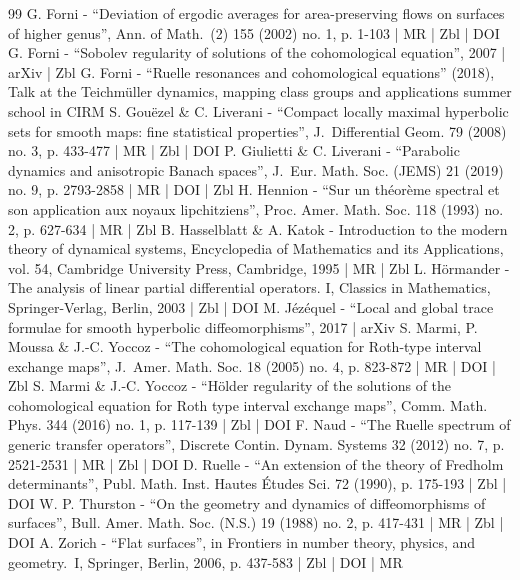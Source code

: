 \documentclass[10pt]{amsart}
\theoremstyle{definition}
\numberwithin{equation}{section}
\begin{document}
\begin{thebibliography}{99}
G. Forni - “Deviation of ergodic averages for area-preserving flows on surfaces of higher genus”, Ann. of Math. (2) 155 (2002) no. 1, p. 1-103 | MR | Zbl | DOI
G. Forni - “Sobolev regularity of solutions of the cohomological equation”, 2007 | arXiv | Zbl
G. Forni - “Ruelle resonances and cohomological equations” (2018), Talk at the Teichmüller dynamics, mapping class groups and applications summer school in CIRM
S. Gouëzel \& C. Liverani - “Compact locally maximal hyperbolic sets for smooth maps: fine statistical properties”, J. Differential Geom. 79 (2008) no. 3, p. 433-477 | MR | Zbl | DOI
P. Giulietti \& C. Liverani - “Parabolic dynamics and anisotropic Banach spaces”, J. Eur. Math. Soc. (JEMS) 21 (2019) no. 9, p. 2793-2858 | MR | DOI | Zbl
H. Hennion - “Sur un théorème spectral et son application aux noyaux lipchitziens”, Proc. Amer. Math. Soc. 118 (1993) no. 2, p. 627-634 | MR | Zbl
B. Hasselblatt \& A. Katok - Introduction to the modern theory of dynamical systems, Encyclopedia of Mathematics and its Applications, vol. 54, Cambridge University Press, Cambridge, 1995 | MR | Zbl
L. Hörmander - The analysis of linear partial differential operators. I, Classics in Mathematics, Springer-Verlag, Berlin, 2003 | Zbl | DOI
M. Jézéquel - “Local and global trace formulae for smooth hyperbolic diffeomorphisms”, 2017 | arXiv
S. Marmi, P. Moussa \& J.-C. Yoccoz - “The cohomological equation for Roth-type interval exchange maps”, J. Amer. Math. Soc. 18 (2005) no. 4, p. 823-872 | MR | DOI | Zbl
S. Marmi \& J.-C. Yoccoz - “Hölder regularity of the solutions of the cohomological equation for Roth type interval exchange maps”, Comm. Math. Phys. 344 (2016) no. 1, p. 117-139 | Zbl | DOI
F. Naud - “The Ruelle spectrum of generic transfer operators”, Discrete Contin. Dynam. Systems 32 (2012) no. 7, p. 2521-2531 | MR | Zbl | DOI
D. Ruelle - “An extension of the theory of Fredholm determinants”, Publ. Math. Inst. Hautes Études Sci. 72 (1990), p. 175-193 | Zbl | DOI
W. P. Thurston - “On the geometry and dynamics of diffeomorphisms of surfaces”, Bull. Amer. Math. Soc. (N.S.) 19 (1988) no. 2, p. 417-431 | MR | Zbl | DOI
A. Zorich - “Flat surfaces”, in Frontiers in number theory, physics, and geometry. I, Springer, Berlin, 2006, p. 437-583 | Zbl | DOI | MR
\end{thebibliography}
\end{document}
